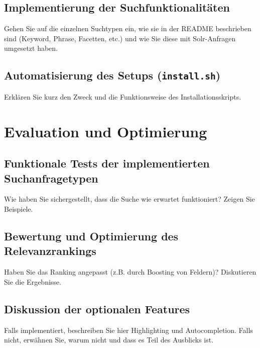 \subsection{Implementierung der Suchfunktionalitäten}
\label{sec:impl_suche}
Gehen Sie auf die einzelnen Suchtypen ein, wie sie in der README beschrieben sind (Keyword, Phrase, Facetten, etc.) und wie Sie diese mit Solr-Anfragen umgesetzt haben.

\subsection{Automatisierung des Setups (\texttt{install.sh})}
\label{sec:impl_install_script}
Erklären Sie kurz den Zweck und die Funktionsweise des Installationsskripts.


\section{Evaluation und Optimierung}
\label{chap:evaluation}

\subsection{Funktionale Tests der implementierten Suchanfragetypen}
\label{sec:eval_tests}
Wie haben Sie sichergestellt, dass die Suche wie erwartet funktioniert? Zeigen Sie Beispiele.

\subsection{Bewertung und Optimierung des Relevanzrankings}
\label{sec:eval_relevanz}
Haben Sie das Ranking angepasst (z.B. durch Boosting von Feldern)? Diskutieren Sie die Ergebnisse.

\subsection{Diskussion der optionalen Features}
\label{sec:eval_optional}
Falls implementiert, beschreiben Sie hier Highlighting und Autocompletion. Falls nicht, erwähnen Sie, warum nicht und dass es Teil des Ausblicks ist.